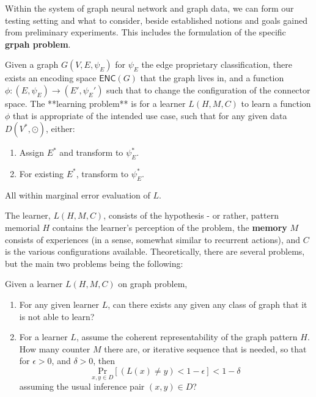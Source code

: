 \documentclass[10pt]{article} %
\begin{document}
Within the system of graph neural network and graph data, we can form our testing setting and what to consider, beside established notions and goals gained from preliminary experiments. This includes the formulation of the specific \textbf{grpah problem}. 
\begin{definition}
  Given a graph $G(V,E,\psi_{E})$ for $\psi_{E}$ the edge proprietary classification, there exists an encoding space $\mathsf{ENC}(G)$ that the graph lives in, and a function $\phi: (E,\psi_{E})\to (E',\psi_{E}')$ such that to change the configuration of the connector space. The **learning problem** is for a learner $L(H,M,C)$ to learn a function $\phi$ that is appropriate of the intended use case, such that for any given data $D(V^{*},\odot)$, either:
  \begin{enumerate}
    \item Assign $E^{*}$ and transform to $\psi_{E}^{*}$. 
    \item For existing $E^{*}$, transform to $\psi^{*}_{E}$. 
  \end{enumerate}
  All within marginal error evaluation of $L$. 
\end{definition}

The learner, $L(H,M,C)$, consists of the hypothesis - or rather, pattern memorial $H$ contains the learner's perception of the problem, the \textbf{memory} $M$ consists of experiences (in a sense, somewhat similar to recurrent actions), and $C$ is the various configurations available. Theoretically, there are several problems, but the main two problems being the following: 

\begin{question}
  Given a learner $L(H,M,C)$ on graph problem, 
  \begin{enumerate}[topsep=0pt,itemsep=0.5pt]
    \item For any given learner $L$, can there exists any given any class of graph that it is not able to learn?
    \item For a learner $L$, assume the coherent representability of the graph pattern $H$. How many counter $M$ there are, or iterative sequence that is needed, so that for $\epsilon>0$, and $\delta>0$, then $$\underset{x,y\in D}{\mathrm{Pr}}[(L(x)\neq y)<1-\epsilon]< 1-\delta$$ assuming the usual inference pair $(x,y)\in D$?
  \end{enumerate}
\end{question}

\clearpage




\clearpage
\end{document}
